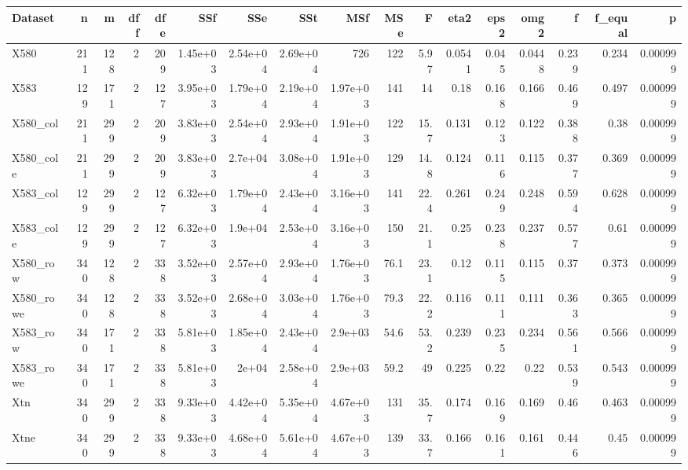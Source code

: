 \begin{tabular}{lrrrrrrrrrrrrrrrr}
\hline
Dataset & n & m & dff & dfe & SSf & SSe & SSt & MSf & MSe & F & eta2 & eps2 & omg2 & f & f\_equal & p \\
\hline
X580 & 211 & 128 & 2 & 209 & 1.45e+03 & 2.54e+04 & 2.69e+04 & 726 & 122 & 5.97 & 0.0541 & 0.045 & 0.0448 & 0.239 & 0.234 & 0.000999 \\
X583 & 129 & 171 & 2 & 127 & 3.95e+03 & 1.79e+04 & 2.19e+04 & 1.97e+03 & 141 & 14 & 0.18 & 0.168 & 0.166 & 0.469 & 0.497 & 0.000999 \\
X580\_col & 211 & 299 & 2 & 209 & 3.83e+03 & 2.54e+04 & 2.93e+04 & 1.91e+03 & 122 & 15.7 & 0.131 & 0.123 & 0.122 & 0.388 & 0.38 & 0.000999 \\
X580\_cole & 211 & 299 & 2 & 209 & 3.83e+03 & 2.7e+04 & 3.08e+04 & 1.91e+03 & 129 & 14.8 & 0.124 & 0.116 & 0.115 & 0.377 & 0.369 & 0.000999 \\
X583\_col & 129 & 299 & 2 & 127 & 6.32e+03 & 1.79e+04 & 2.43e+04 & 3.16e+03 & 141 & 22.4 & 0.261 & 0.249 & 0.248 & 0.594 & 0.628 & 0.000999 \\
X583\_cole & 129 & 299 & 2 & 127 & 6.32e+03 & 1.9e+04 & 2.53e+04 & 3.16e+03 & 150 & 21.1 & 0.25 & 0.238 & 0.237 & 0.577 & 0.61 & 0.000999 \\
X580\_row & 340 & 128 & 2 & 338 & 3.52e+03 & 2.57e+04 & 2.93e+04 & 1.76e+03 & 76.1 & 23.1 & 0.12 & 0.115 & 0.115 & 0.37 & 0.373 & 0.000999 \\
X580\_rowe & 340 & 128 & 2 & 338 & 3.52e+03 & 2.68e+04 & 3.03e+04 & 1.76e+03 & 79.3 & 22.2 & 0.116 & 0.111 & 0.111 & 0.363 & 0.365 & 0.000999 \\
X583\_row & 340 & 171 & 2 & 338 & 5.81e+03 & 1.85e+04 & 2.43e+04 & 2.9e+03 & 54.6 & 53.2 & 0.239 & 0.235 & 0.234 & 0.561 & 0.566 & 0.000999 \\
X583\_rowe & 340 & 171 & 2 & 338 & 5.81e+03 & 2e+04 & 2.58e+04 & 2.9e+03 & 59.2 & 49 & 0.225 & 0.22 & 0.22 & 0.539 & 0.543 & 0.000999 \\
Xtn & 340 & 299 & 2 & 338 & 9.33e+03 & 4.42e+04 & 5.35e+04 & 4.67e+03 & 131 & 35.7 & 0.174 & 0.169 & 0.169 & 0.46 & 0.463 & 0.000999 \\
Xtne & 340 & 299 & 2 & 338 & 9.33e+03 & 4.68e+04 & 5.61e+04 & 4.67e+03 & 139 & 33.7 & 0.166 & 0.161 & 0.161 & 0.446 & 0.45 & 0.000999 \\
\hline
\end{tabular}

